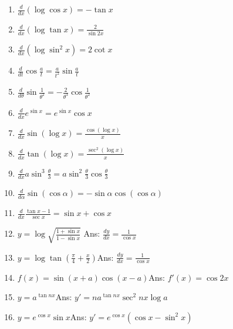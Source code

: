 \begin{enumerate}
\item
$\frac{d}{dx}(\log \cos x) = -\tan x$

\item
$\frac{d}{dx}(\log \tan x) = \frac{2}{\sin 2x}$

\item
$\frac{d}{dx}(\log \sin^2 x) = 2 \cot x$

\item
$\frac{d}{dt} \cos \frac{a}{t} = \frac{a}{t^2} \sin \frac{a}{t}$

\item
$\frac{d}{d\theta} \sin \frac{1}{\theta^2} = -\frac{2}{\theta^3} \cos \frac{1}{\theta^2}$

\item
$\frac{d}{dx} e^{\sin x} = e^{\sin x} \cos x$

\item
$\frac{d}{dx} \sin(\log x) = \frac{\cos(\log x)}{x}$

\item
$\frac{d}{dx} \tan(\log x) = \frac{\sec^2(\log x)}{x}$

\item
$\frac{d}{dx} a \sin^3 \frac{\theta}{3} = a \sin^2 \frac{\theta}{3} \cos \frac{\theta}{3}$

\item
$\frac{d}{d\alpha} \sin(\cos \alpha) = -\sin \alpha \cos(\cos \alpha)$

\item
$\frac{d}{dx} \frac{\tan x - 1}{\sec x} = \sin x + \cos x$

\item
$y = \log \sqrt{ \frac{1 + \sin x}{1 - \sin x} }$\qquad\qquad\qquad\qquad\qquad\qquad 
Ans:  $\frac{dy}{dx} 	= \frac{1}{\cos x} $

\item
$y = \log \tan \left ( \frac{\pi}{4} + \frac{x}{2} \right )$\qquad\qquad\qquad\qquad\qquad\qquad Ans:  
$\frac{dy}{dx} 	= \frac{1}{\cos x}$

\item
$f(x) = \sin(x + a)\cos(x - a)$\qquad\qquad\qquad\qquad\qquad\qquad Ans:  $f'(x) 	= \cos 2x$

\item
$y = a^{\tan nx}$\qquad\qquad\qquad\qquad\qquad\qquad Ans:  $y' 	= na^{\tan nx}\sec^2 nx\log a$

\item
$y = e^{\cos x}\sin x$\qquad\qquad\qquad\qquad\qquad\qquad Ans:  $y' = e^{\cos x} (\cos x - \sin^2 x)$


\end{enumerate}

